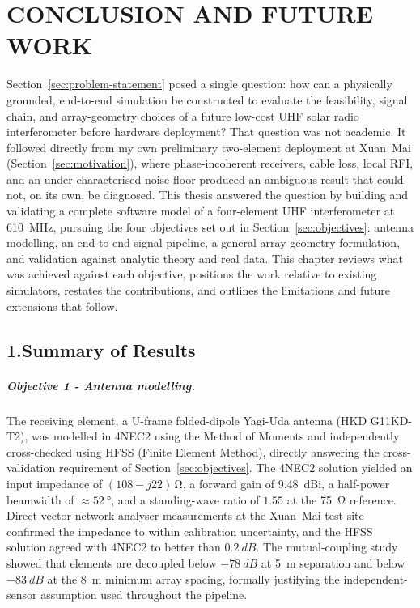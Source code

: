 \chapter*{CONCLUSION AND FUTURE WORK}

Section~\ref{sec:problem-statement} posed a single question: how can a
physically grounded, end-to-end simulation be constructed to evaluate the
feasibility, signal chain, and array-geometry choices of a future low-cost UHF
solar radio interferometer before hardware deployment? That question was not
academic. It followed directly from my own preliminary two-element
deployment at Xuan~Mai (Section~\ref{sec:motivation}), where phase-incoherent
receivers, cable loss, local RFI, and an under-characterised noise floor
produced an ambiguous result that could not, on its own, be diagnosed. This
thesis answered the question by building and validating a complete software
model of a four-element UHF interferometer at \SI{610}{\mega\hertz}, pursuing
the four objectives set out in Section~\ref{sec:objectives}: antenna
modelling, an end-to-end signal pipeline, a general array-geometry
formulation, and validation against analytic theory and real data. This
chapter reviews what was achieved against each objective, positions the work
relative to existing simulators, restates the contributions, and outlines the
limitations and future extensions that follow.

\section*{1.\quad Summary of Results}

\paragraph{Objective 1 - Antenna modelling.}
The receiving element, a U-frame folded-dipole Yagi-Uda antenna (HKD G11KD-T2), was
modelled in 4NEC2 using the Method of Moments and independently cross-checked using HFSS
(Finite Element Method), directly answering the cross-validation requirement of
Section~\ref{sec:objectives}. The 4NEC2 solution yielded an input impedance of $(108 - j22)\,\si{\ohm}$, a
forward gain of \SI{9.48}{dBi}, a half-power beamwidth of $\approx\SI{52}{\degree}$, and
a standing-wave ratio of $1.55$ at the \SI{75}{\ohm} reference. Direct vector-network-analyser
measurements at the Xuan~Mai test site confirmed the impedance to within calibration
uncertainty, and the HFSS solution agreed with 4NEC2 to better than $0.2~\si{dB}$.
The mutual-coupling study showed that elements are decoupled below $-78~\si{dB}$ at
\SI{5}{\metre} separation and below $-83~\si{dB}$ at the \SI{8}{\metre} minimum array
spacing, formally justifying the independent-sensor assumption used throughout the
pipeline.

